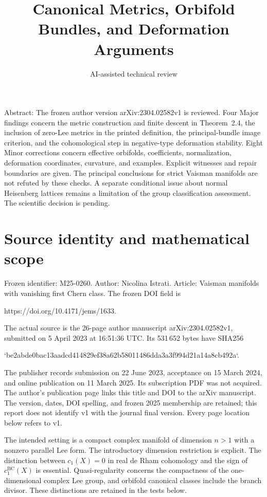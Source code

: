 \documentclass[10pt]{article}
\title{Canonical Metrics, Orbifold Bundles, and Deformation Arguments}
\author{AI-assisted technical review}
\date{}
\begin{document}
\maketitle
Abstract: The frozen author version arXiv:2304.02582v1 is reviewed. Four Major findings concern the metric construction and finite descent in Theorem 2.4, the inclusion of zero-Lee metrics in the printed definition, the principal-bundle image criterion, and the cohomological step in negative-type deformation stability. Eight Minor corrections concern effective orbifolds, coefficients, normalization, deformation coordinates, curvature, and examples. Explicit witnesses and repair boundaries are given. The principal conclusions for strict Vaisman manifolds are not refuted by these checks. A separate conditional issue about normal Heisenberg lattices remains a limitation of the group classification assessment. The scientific decision is pending.\par
\section*{Source identity and mathematical scope}
Frozen identifier: M25-0260. Author: Nicolina Istrati. Article: Vaisman manifolds with vanishing first Chern class. The frozen DOI field is\par
https://doi.org/10.4171/jems/1633.\par
The actual source is the 26-page author manuscript arXiv:2304.02582v1, submitted on 5 April 2023 at 16:51:36 UTC. Its 531 652 bytes have SHA256\par
`be2abde0bac13aadcd414829ef38a62b58011486dda3a3f994d21a14a8cb492a`.\par
The publisher records submission on 22 June 2023, acceptance on 15 March 2024, and online publication on 11 March 2025. Its subscription PDF was not acquired. The author’s publication page links this title and DOI to the arXiv manuscript. The version, dates, DOI spelling, and frozen 2025 membership are retained; this report does not identify v1 with the journal final version. Every page location below refers to v1.\par
The intended setting is a compact complex manifold of dimension \(n>1\) with a nonzero parallel Lee form. The introductory dimension restriction is explicit. The distinction between \(c_1(X)=0\) in real de Rham cohomology and the sign of \(c_1^{\mathrm{BC}}(X)\) is essential. Quasi-regularity concerns the compactness of the one-dimensional complex Lee group, and orbifold canonical classes include the branch divisor. These distinctions are retained in the tests below.\par
\end{document}
